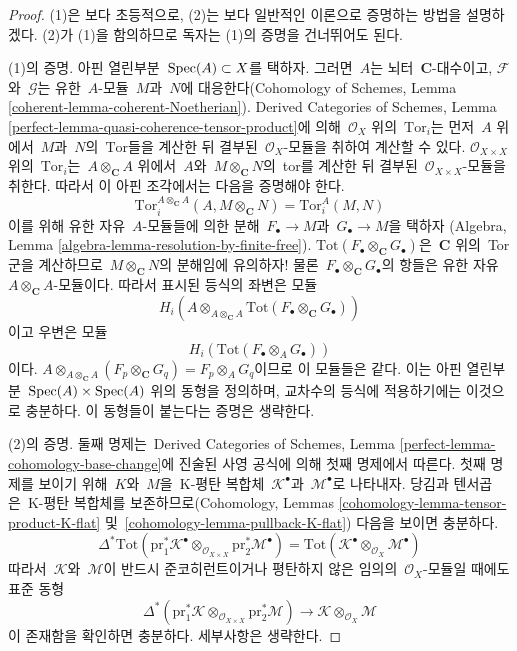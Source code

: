 \begin{proof}
(1)은 보다 초등적으로, (2)는 보다 일반적인 이론으로 증명하는 방법을
설명하겠다. (2)가 (1)을 함의하므로 독자는 (1)의 증명을 건너뛰어도 된다.

\medskip\noindent
(1)의 증명. 아핀 열린부분\  $\mathop{\mathrm{Spec}}(A) \subset X$를 택하자.
그러면\  $A$는 뇌터\  $\mathbf{C}$-대수이고, $\mathcal{F}$와\  $\mathcal{G}$는
유한\  $A$-모듈\  $M$과\  $N$에 대응한다(Cohomology of Schemes, Lemma
\ref{coherent-lemma-coherent-Noetherian}).
Derived Categories of Schemes, Lemma
\ref{perfect-lemma-quasi-coherence-tensor-product}에 의해\ 
$\mathcal{O}_X$ 위의\  $\text{Tor}_i$는 먼저\  $A$ 위에서\  $M$과\  $N$의\ 
$\text{Tor}$들을 계산한 뒤 결부된\  $\mathcal{O}_X$-모듈을 취하여 계산할
수 있다. $\mathcal{O}_{X \times X}$ 위의\  $\text{Tor}_i$는\ 
$A \otimes_\mathbf{C} A$ 위에서\  $A$와\  $M \otimes_\mathbf{C} N$의\  tor를
계산한 뒤 결부된\  $\mathcal{O}_{X \times X}$-모듈을 취한다.
따라서 이 아핀 조각에서는 다음을 증명해야 한다.
$$
\text{Tor}_i^{A \otimes_\mathbf{C} A}(A, M \otimes_\mathbf{C} N) =
\text{Tor}_i^A(M, N)
$$
이를 위해 유한 자유\  $A$-모듈들에 의한 분해\ 
$F_\bullet \to M$과\  $G_\bullet \to M$을 택하자
(Algebra, Lemma \ref{algebra-lemma-resolution-by-finite-free}).
$\text{Tot}(F_\bullet \otimes_\mathbf{C} G_\bullet)$은\ 
$\mathbf{C}$ 위의\  Tor 군을 계산하므로\  $M \otimes_\mathbf{C} N$의
분해임에 유의하자! 물론\  $F_\bullet \otimes_\mathbf{C} G_\bullet$의
항들은 유한 자유\  $A \otimes_\mathbf{C} A$-모듈이다.
따라서 표시된 등식의 좌변은 모듈
$$
H_i(A \otimes_{A \otimes_\mathbf{C} A}
\text{Tot}(F_\bullet \otimes_\mathbf{C} G_\bullet))
$$
이고 우변은 모듈
$$
H_i(\text{Tot}(F_\bullet \otimes_A G_\bullet))
$$
이다. $A \otimes_{A \otimes_\mathbf{C} A} (F_p \otimes_\mathbf{C} G_q)
= F_p \otimes_A G_q$이므로 이 모듈들은 같다.
이는 아핀 열린부분\  $\mathop{\mathrm{Spec}}(A) \times \mathop{\mathrm{Spec}}(A)$ 위의 동형을 정의하며,
교차수의 등식에 적용하기에는 이것으로 충분하다.
이 동형들이 붙는다는 증명은 생략한다.

\medskip\noindent
(2)의 증명. 둘째 명제는\  Derived Categories of Schemes, Lemma
\ref{perfect-lemma-cohomology-base-change}에 진술된 사영 공식에 의해 첫째
명제에서 따른다. 첫째 명제를 보이기 위해\  $K$와\  $M$을\  K-평탄 복합체\ 
$\mathcal{K}^\bullet$과\  $\mathcal{M}^\bullet$로 나타내자.
당김과 텐서곱은\  K-평탄 복합체를 보존하므로(Cohomology, Lemmas
\ref{cohomology-lemma-tensor-product-K-flat} 및\ 
\ref{cohomology-lemma-pullback-K-flat}) 다음을 보이면 충분하다.
$$
\Delta^*\text{Tot}(
\text{pr}_1^*\mathcal{K}^\bullet
\otimes_{\mathcal{O}_{X \times X}} \text{pr}_2^*\mathcal{M}^\bullet)
=
\text{Tot}(
\mathcal{K}^\bullet \otimes_{\mathcal{O}_X} \mathcal{M}^\bullet)
$$
따라서\  $\mathcal{K}$와\  $\mathcal{M}$이 반드시 준코히런트이거나 평탄하지
않은 임의의\  $\mathcal{O}_X$-모듈일 때에도 표준 동형
$$
\Delta^*(\text{pr}_1^*\mathcal{K}
\otimes_{\mathcal{O}_{X \times X}} \text{pr}_2^*\mathcal{M})
\longrightarrow
\mathcal{K} \otimes_{\mathcal{O}_X} \mathcal{M}
$$
이 존재함을 확인하면 충분하다. 세부사항은 생략한다.
\end{proof}

